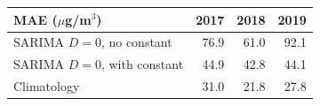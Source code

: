 \begin{tabular}{|l|r|r|r|}
\hline
\textbf{MAE ($\mu$g/m$^3$)} & \textbf{2017} & \textbf{2018} & \textbf{2019} \\\hline
SARIMA $D=0$, no constant & 76.9 & 61.0 & 92.1 \\\hline
SARIMA $D=0$, with constant & 44.9 & 42.8 & 44.1 \\\hline
Climatology & 31.0 & 21.8 & 27.8 \\\hline
\end{tabular}
